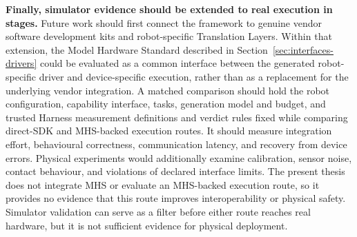 \textbf{Finally, simulator evidence should be extended to real execution in
stages.} Future work should first connect the framework to genuine vendor
software development kits and robot-specific Translation Layers. Within that
extension, the Model Hardware Standard described in
Section~\ref{sec:interfaces-drivers} could be evaluated as a common interface
between the generated robot-specific driver and device-specific execution,
rather than as a replacement for the underlying vendor integration. A matched
comparison should hold the robot configuration, capability interface, tasks,
generation model and budget, and trusted Harness measurement definitions and
verdict rules fixed while comparing direct-SDK and MHS-backed execution routes.
It should measure integration effort, behavioural correctness, communication
latency, and recovery from device errors. Physical experiments would
additionally examine calibration, sensor noise, contact behaviour, and
violations of declared interface limits. The present thesis does not integrate
MHS or evaluate an MHS-backed execution route, so it provides no evidence that
this route improves interoperability or physical safety. Simulator validation
can serve as a filter before either route reaches real hardware, but it is not
sufficient evidence for physical deployment.
